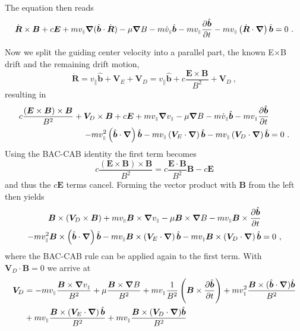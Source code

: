\documentclass{scrartcl}
\renewcommand{\vec}[1]{\boldsymbol{#1}}
\newcommand{\uv}[1]{\hat{\vec{#1}}}
\newcommand{\bnabla}{\vec{\nabla}}
\newcommand{\rvgc}{\vec{R}} %
\newcommand{\subparallel}{{\scriptscriptstyle\parallel}}
\begin{document}
The equation then reads
\begin{equation*}
    \dot{\rvgc}\times\vec{B} + c\vec{E}+ mv_\subparallel\bnabla(\uv{b}\cdot\dot{\rvgc})  - \mu\bnabla B - m\dot{v}_\subparallel\uv{b} - mv_\subparallel\pdv{\uv{b}}{t} - mv_\subparallel\left(\dot{\rvgc}\cdot\bnabla\right)\uv{b} = 0 \ .
\end{equation*}

Now we split the guiding center velocity into a parallel part, the known E$\times$B drift and the remaining drift motion,
\begin{equation*}
    \dot{\rvgc} = v_\subparallel\uv{b} + \vec{V}_{\!\!E} + \vec{V}_{\!\!D} = v_\subparallel\uv{b} + c\frac{\vec{E}\times\vec{B}}{B^2} + \vec{V}_{\!\!D}\ ,
\end{equation*}
resulting in
\begin{align*}
    c\frac{(\vec{E}\times\vec{B})\times\vec{B}}{B^2} + \vec{V}_{\!\!D}\times\vec{B} + c\vec{E} + mv_\subparallel\bnabla v_\subparallel - \mu\bnabla B - m\dot{v}_\subparallel\uv{b} - mv_\subparallel\pdv{\uv{b}}{t} & \\ - mv_\subparallel^2\left(\uv{b}\cdot\bnabla\right)\uv{b} - mv_\subparallel\left(\vec{V}_{\!\!E}\cdot\bnabla\right)\uv{b} - mv_\subparallel\left(\vec{V}_{\!\!D}\cdot\bnabla\right)\uv{b}  &= 0 \ .
\end{align*}
Using the BAC-CAB identity the first term becomes
\begin{equation*}
    c\frac{(\vec{E}\times\vec{B})\times\vec{B}}{B^2} = c\frac{\vec{E}\cdot\vec{B}}{B^2}\vec{B} - c\vec{E}
\end{equation*}
and thus the $c\vec{E}$ terms cancel. Forming the vector product with $\vec{B}$ from the left then yields
\begin{align*}
    \vec{B}\times(\vec{V}_{\!\!D}\times\vec{B}) + mv_\subparallel\vec{B}\times\bnabla v_\subparallel  - \mu\vec{B}\times\bnabla B - mv_\subparallel\vec{B}\times\pdv{\uv{b}}{t}  & \\- mv_\subparallel^2\vec{B}\times\left(\uv{b}\cdot\bnabla\right)\uv{b}  - mv_\subparallel\vec{B}\times\left(\vec{V}_{\!\!E}\cdot\bnabla\right)\uv{b} - mv_\subparallel\vec{B}\times\left(\vec{V}_{\!\!D}\cdot\bnabla\right)\uv{b}  &= 0 \ ,
\end{align*}
where the BAC-CAB rule can be applied again to the first term. With $\vec{V}_{\!\!D}\cdot\vec{B} = 0$ we arrive at
\begin{align*}
    \vec{V}_{\!\!D} &= -mv_\subparallel\frac{\vec{B}\times\bnabla v_\subparallel}{B^2} + \mu\frac{\vec{B}\times\bnabla B}{B^2} + mv_\subparallel\frac{1}{B^2}\left(\vec{B}\times\pdv{\uv{b}}{t}\right) + mv_\subparallel^2\frac{\vec{B}\times(\uv{b}\cdot\bnabla)\uv{b}}{B^2}  \\
    & + mv_\subparallel\frac{\vec{B}\times\left(\vec{V}_{\!\!E}\cdot\bnabla\right)\uv{b}}{B^2} + mv_\subparallel\frac{\vec{B}\times(\vec{V}_{\!\!D}\cdot\bnabla)\uv{b}}{B^2} 
\end{align*}
\end{document}

